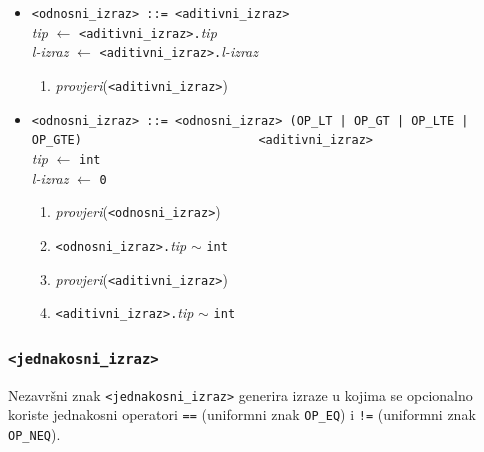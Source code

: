\documentclass[times, 12pt, utf8]{book}
\begin{document}
\begin{itemize}

\item
\verb|<odnosni_izraz> ::= <aditivni_izraz>|\\
\emph{tip} \(\leftarrow\) \verb|<aditivni_izraz>.|\emph{tip}\\
\emph{l-izraz} \(\leftarrow\) \verb|<aditivni_izraz>.|\emph{l-izraz}
\begin{enumerate}
\item
\emph{provjeri}(\verb|<aditivni_izraz>|)
\end{enumerate}

\item
\verb#<odnosni_izraz> ::= <odnosni_izraz> (OP_LT | OP_GT | OP_LTE | OP_GTE)#
\verb#                        <aditivni_izraz>#\\
\emph{tip} \(\leftarrow\) \verb|int|\\
\emph{l-izraz} \(\leftarrow\) \verb|0|
\begin{enumerate}
\item
\emph{provjeri}(\verb|<odnosni_izraz>|)
\item
\verb|<odnosni_izraz>.|\emph{tip} \(\sim\) \verb|int|
\item
\emph{provjeri}(\verb|<aditivni_izraz>|)
\item
\verb|<aditivni_izraz>.|\emph{tip} \(\sim\) \verb|int|
\end{enumerate}

\end{itemize}

\subsubsection{\texttt{<jednakosni\_izraz>}}

Nezavršni znak \verb|<jednakosni_izraz>| generira izraze u kojima se opcionalno koriste jednakosni operatori \verb|==| (uniformni znak \verb|OP_EQ|) i \verb|!=| (uniformni znak \verb|OP_NEQ|).
\end{document}
